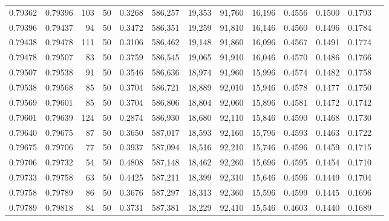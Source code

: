 \begin{tabular}{rrrrrrrrrrrrr}
0.79362 & 0.79396 &   103 &  50 &                                     0.3268 & 586,257 &  19,353 &  91,760 &  16,196 & 0.4556 & 0.1500 & 0.1793 \\
0.79396 & 0.79437 &    94 &  50 &                                     0.3472 & 586,351 &  19,259 &  91,810 &  16,146 & 0.4560 & 0.1496 & 0.1784 \\
0.79438 & 0.79478 &   111 &  50 &                                     0.3106 & 586,462 &  19,148 &  91,860 &  16,096 & 0.4567 & 0.1491 & 0.1774 \\
0.79478 & 0.79507 &    83 &  50 &                                     0.3759 & 586,545 &  19,065 &  91,910 &  16,046 & 0.4570 & 0.1486 & 0.1766 \\
0.79507 & 0.79538 &    91 &  50 &                                     0.3546 & 586,636 &  18,974 &  91,960 &  15,996 & 0.4574 & 0.1482 & 0.1758 \\
0.79538 & 0.79568 &    85 &  50 &                                     0.3704 & 586,721 &  18,889 &  92,010 &  15,946 & 0.4578 & 0.1477 & 0.1750 \\
0.79569 & 0.79601 &    85 &  50 &                                     0.3704 & 586,806 &  18,804 &  92,060 &  15,896 & 0.4581 & 0.1472 & 0.1742 \\
0.79601 & 0.79639 &   124 &  50 &                                     0.2874 & 586,930 &  18,680 &  92,110 &  15,846 & 0.4590 & 0.1468 & 0.1730 \\
0.79640 & 0.79675 &    87 &  50 &                                     0.3650 & 587,017 &  18,593 &  92,160 &  15,796 & 0.4593 & 0.1463 & 0.1722 \\
0.79675 & 0.79706 &    77 &  50 &                                     0.3937 & 587,094 &  18,516 &  92,210 &  15,746 & 0.4596 & 0.1459 & 0.1715 \\
0.79706 & 0.79732 &    54 &  50 &                                     0.4808 & 587,148 &  18,462 &  92,260 &  15,696 & 0.4595 & 0.1454 & 0.1710 \\
0.79733 & 0.79758 &    63 &  50 &                                     0.4425 & 587,211 &  18,399 &  92,310 &  15,646 & 0.4596 & 0.1449 & 0.1704 \\
0.79758 & 0.79789 &    86 &  50 &                                     0.3676 & 587,297 &  18,313 &  92,360 &  15,596 & 0.4599 & 0.1445 & 0.1696 \\
0.79789 & 0.79818 &    84 &  50 &                                     0.3731 & 587,381 &  18,229 &  92,410 &  15,546 & 0.4603 & 0.1440 & 0.1689 \\

\end{tabular}
